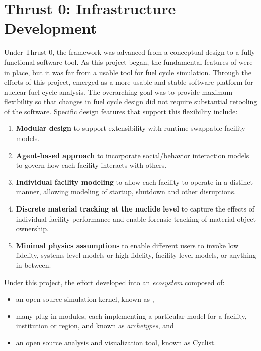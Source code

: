 \chapter{Thrust 0: \Cyclus Infrastructure Development}\label{chap:thrust0}

Under Thrust 0, the \Cyclus framework was advanced from a conceptual design to
a fully functional software tool.  As this project began, the fundamental
features of \Cyclus were in place, but it was far from a usable tool for fuel
cycle simulation.  Through the efforts of this project, \Cyclus emerged as a
more usable and stable software platform for nuclear fuel cycle analysis.  The
overarching goal was to provide maximum flexibility so that changes in fuel
cycle design did not require substantial retooling of the software.  Specific
design features that support this flexibility include:
\begin{enumerate}
\item \textbf{Modular design} to support extensibility with runtime swappable facility models.
\item \textbf{Agent-based approach} to incorporate social/behavior interaction models to govern how each facility interacts with others.
\item \textbf{Individual facility modeling} to allow each facility to operate in a distinct manner, allowing modeling of startup, shutdown and other disruptions.
\item \textbf{Discrete material tracking at the nuclide level} to capture the effects of individual facility performance and enable forensic tracking of material object ownership.
\item \textbf{Minimal physics assumptions} to enable different users to invoke low fidelity, systems level models or high fidelity, facility level models, or anything in between.
\end{enumerate}

Under this project, the \Cyclus effort developed into an \textit{ecosystem} composed of:
\begin{itemize}
\item an open source simulation kernel, known as \Cyclus,
\item many plug-in modules, each implementing a particular model for a
  facility, institution or region, and known as \textit{archetypes}, and
\item an open source analysis and visualization tool, known as Cyclist.
\end{itemize}

